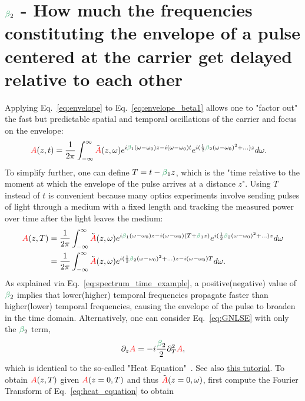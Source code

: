 \section{$\betag_2$ - How much the frequencies constituting the envelope of a pulse centered at the carrier get delayed relative to each other}
\label{sec:GVD}
Applying Eq.~\ref{eq:envelope} to Eq.~\ref{eq:envelope_beta1} allows one to "factor out" the fast but predictable spatial and temporal oscillations of the carrier and focus on the envelope:
\begin{align}
    \A(z,t)  &= \frac{1}{2\pi}  \int_{-\infty}^{\infty} \Tilde{\A}(z,\omega) e^{i\betag_1(\omega-\omega_0)z-i(\omega-\omega_0) t} e^{i(\frac{1}{2}\betag_2(\omega-\omega_0)^2+...)z} d\omega.
\end{align}
To simplify further, one can define $T=t-\betag_1z$, which is the "time relative to the moment at which the envelope of the pulse arrives at a distance $z$". Using $T$ instead of $t$ is convenient because many optics experiments involve sending pulses of light through a medium with a fixed length and tracking the measured power over time after the light leaves the medium:   
\begin{align}
    \A(z,T)  &= \frac{1}{2\pi}  \int_{-\infty}^{\infty} \Tilde{\A}(z,\omega) e^{i\betag_1(\omega-\omega_0)z-i(\omega-\omega_0) (T+\betag_1z)} e^{i(\frac{1}{2}\betag_2(\omega-\omega_0)^2+...)z} d\omega \\ \nonumber
    &= \frac{1}{2\pi}  \int_{-\infty}^{\infty} \Tilde{\A}(z,\omega) e^{i(\frac{1}{2}\betag_2(\omega-\omega_0)^2+...)z-i(\omega-\omega_0)T} d\omega.
\end{align} 
As explained via Eq.~\ref{eq:spectrum_time_example}, a positive(negative) value of $\betag_2$ implies that lower(higher) temporal frequencies propagate faster than higher(lower) temporal frequencies, causing the envelope of the pulse to broaden in the time domain. Alternatively, one can consider Eq.~\ref{eq:GNLSE} with only the $\betag_2$ term,
\begin{align}
    \label{eq:heat_equation}
    \partial_z \A = -i  \frac{\betag_2}{2}\partial_T^2\A,
\end{align}
which is identical to the so-called "Heat Equation"~\cite{Fourier_heat_original,Fourier_heat_english}. See also 
\href{https://digitalcommons.ursinus.edu/cgi/viewcontent.cgi?article=1008&context=triumphs_differ}{this tutorial}. To obtain $\textcolor{red}{A}(z,T)$ given $\textcolor{red}{A}(z=0,T)$ and thus $\tilde{\textcolor{red}{A}}(z=0,\omega)$, first compute the Fourier Transform of Eq.~\ref{eq:heat_equation} to obtain
